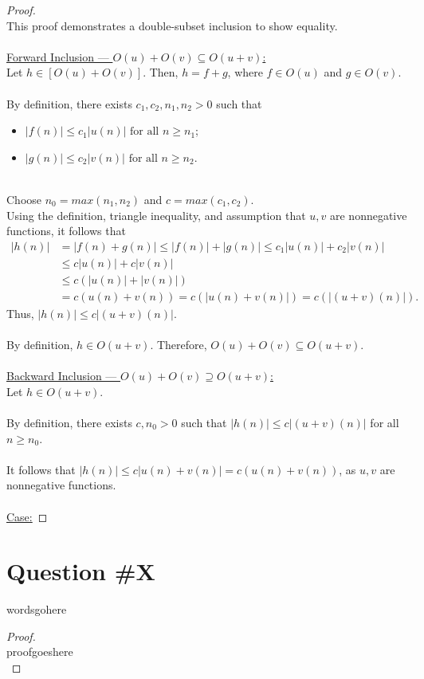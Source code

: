 \documentclass[12pt]{article}
\begin{document}
\begin{proof}
\leavevmode\\
    This proof demonstrates a double-subset inclusion to show equality. \\
    \\
    \underline{Forward Inclusion — \(O(u) + O(v) \subseteq O(u + v)\):} \\
    Let \( h \in [O(u) + O(v)] \). Then, \( h = f + g \), where \( f \in O(u) \) and \( g \in O(v) \). \\
    \\
    By definition, there exists \( c_1, c_2, n_1, n_2 > 0 \) such that
    \begin{itemize}
        \item \( |f(n)| \leq c_1|u(n)| \text{ for all } n \geq n_1 \);
        \item \( |g(n)| \leq c_2|v(n)| \text{ for all } n \geq n_2 \).
    \end{itemize}
    \leavevmode\\
    Choose \( n_0 = max(n_1, n_2) \) and \( c = max(c_1, c_2) \). \\
    Using the definition, triangle inequality, and assumption that \( u, v \) are nonnegative functions, it follows that
    \begin{equation*}
        \begin{aligned}
            |h(n)| &= |f(n) + g(n)| \leq |f(n)| + |g(n)| \leq c_1|u(n)| + c_2|v(n)| \\
            &\leq c|u(n)| + c|v(n)| \\
            &\leq c(|u(n)| + |v(n)|) \\
            &= c(u(n) + v(n)) = c(|u(n) + v(n)|) = c(|(u + v)(n)|) \text{.}
        \end{aligned}
    \end{equation*}
    Thus, \( |h(n)| \leq c|(u + v)(n)| \). \\
    \\
    By definition, \( h \in O(u + v) \). Therefore, \( O(u) + O(v) \subseteq O(u + v) \). \\
    \\
    \underline{Backward Inclusion — \(O(u) + O(v) \supseteq O(u + v)\):} \\
    Let \( h \in O(u + v) \). \\
    \\
    By definition, there exists \( c, n_0 > 0 \) such that \( |h(n)| \leq c|(u + v)(n)| \) for all \( n \geq n_0 \). \\
    \\
    It follows that \( |h(n)| \leq c|u(n) + v(n)| = c(u(n) + v(n)) \), as \( u, v\) are nonnegative functions. \\
    \\
    \underline{Case:}

\end{proof}
\pagebreak

\section*{Question \#X}
wordsgohere

\begin{proof}
\leavevmode\\
    proofgoeshere \\
\end{proof}
\pagebreak
\end{document}
